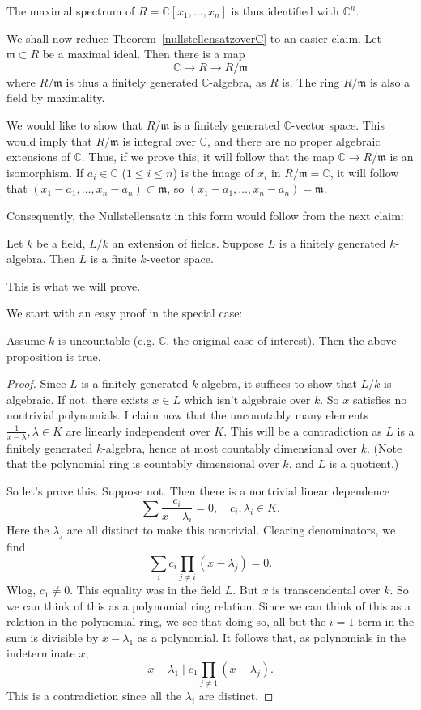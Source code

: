 The maximal spectrum of $R=\mathbb{C}[x_1, \dots, x_n]$ is thus identified with
$\mathbb{C}^n$. 

We shall now reduce Theorem~\ref{nullstellensatzoverC} to an easier claim.
Let
$\mathfrak{m}\subset R$ be a maximal ideal. Then there is a map
\[ \mathbb{C} \to R \to R/\mathfrak{m}  \]
where $R/\mathfrak{m}$ is thus a finitely generated $\mathbb{C}$-algebra, as
$R$ is.  The ring $R/\mathfrak{m}$ is also a field by maximality.

We would like to show that $R/\mathfrak{m}$ is a finitely generated $\mathbb{C}$-vector
space. This would imply that $R/\mathfrak{m}$ is integral over $\mathbb{C}$,
and there are no proper algebraic extensions of $\mathbb{C}$. Thus, if we
prove this, it will follow that the map $\mathbb{C} \to R/\mathfrak{m}$ is an
isomorphism. If $a_i \in \mathbb{C}$ ($1 \leq i \leq n$) is the image of $x_i $ in $R/\mathfrak{m} =
\mathbb{C}$, it will follow that $(x_1 - a_1, \dots, x_n - a_n) \subset
\mathfrak{m}$, so $(x_1 - a_1, \dots, x_n - a_n)= 
\mathfrak{m}$. 


Consequently, the Nullstellensatz in this form would follow from the next claim:

\begin{proposition} 
Let $k$ be a field, $L/k$ an extension of fields. Suppose $L$ is a finitely
generated $k$-algebra. Then $L$	is a finite $k$-vector space.
\end{proposition} 
This is what we will prove.

We start with an easy proof in the special case:
\begin{lemma} 
Assume $k$ is uncountable (e.g. $\mathbb{C}$, the original case of interest).
Then the above proposition is true. 
\end{lemma} 
\begin{proof} 
Since $L$ is a finitely generated $k$-algebra, it suffices to show that $L/k$ is algebraic.
If not, there exists $x \in L$ which isn't algebraic over $k$. So $x$ satisfies
no nontrivial polynomials. 
I claim now that the uncountably many elements $\frac{1}{x-\lambda}, \lambda \in K$ are linearly
independent over $K$. This will be a contradiction as $L$ is a finitely
generated $k$-algebra, hence at most countably dimensional over $k$. (Note that
the polynomial ring is countably dimensional over $k$, and $L$ is a quotient.)

So let's prove this. Suppose not. Then there is a nontrivial linear dependence
\[ \sum \frac{c_i}{x - \lambda_i}  = 0, \quad c_i, \lambda_i \in K. \]
Here the $\lambda_j$ are all distinct to make this nontrivial. Clearing denominators, we find
\[ \sum_i c_i \prod_{j \neq i } (x- \lambda_j) = 0. \]
Wlog, $c_1 \neq 0$. 
This equality was in the field $L$. But $x$ is transcendental over $k$. So we
can think of this as a polynomial ring relation. 
Since we can think of this as a relation in the polynomial ring, we see that
doing so, all but the $i =1$ term in the sum is divisible by $x - \lambda_1$
as a polynomial.
It follows that, as polynomials in the indeterminate $x$, 
\[ x - \lambda_1 \mid c_1 \prod_{j \neq 1} (x - \lambda_j).  \]
This is a contradiction since all the $\lambda_i$ are distinct.
\end{proof} 

